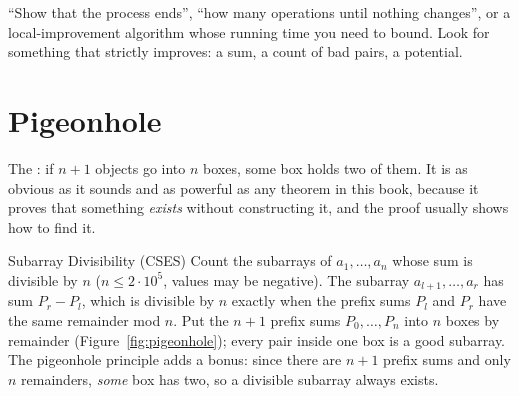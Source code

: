 \begin{recognize}
``Show that the process ends'', ``how many operations until nothing changes'', or a local-improvement algorithm whose
running time you need to bound. Look for something that strictly improves: a sum, a count of bad pairs, a potential.
\end{recognize}

\section[Pigeonhole]{Pigeonhole \hfill \silver}\label{sec:pigeonhole}

The : if $n + 1$ objects go into $n$ boxes, some box holds two of them. It is as obvious as it
sounds and as powerful as any theorem in this book, because it proves that something \emph{exists} without constructing
it, and the proof usually shows how to find it.

\begin{problem}{Subarray Divisibility (CSES)}
Count the subarrays of $a_1, \dots, a_n$ whose sum is divisible by $n$ ($n \le 2\cdot10^5$, values may be negative).
\solution The subarray $a_{l+1}, \dots, a_r$ has sum $P_r - P_l$, which is divisible by $n$ exactly when the prefix sums
$P_l$ and $P_r$ have the same remainder mod $n$. Put the $n + 1$ prefix sums $P_0, \dots, P_n$ into $n$ boxes by remainder
(Figure~\ref{fig:pigeonhole}); every pair inside one box is a good subarray. The pigeonhole principle adds a bonus: since
there are $n + 1$ prefix sums and only $n$ remainders, \emph{some} box has two, so a divisible subarray always exists.
\end{problem}

